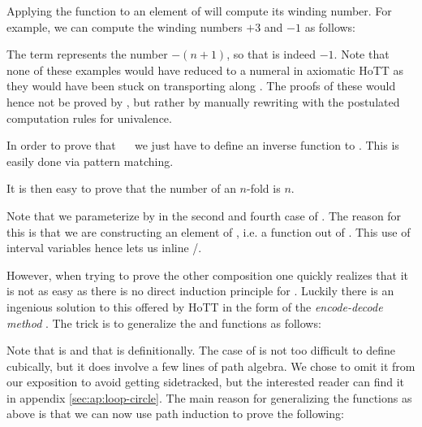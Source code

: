 Applying the  function to an element of  will
compute its winding number. For example, we can compute the winding
numbers $+3$ and $-1$ as follows:
%

The term   represents the number $- (n+1)$, so that
  is indeed $-1$. Note that none of these examples
would have reduced to a numeral in axiomatic HoTT as they would have been stuck
on transporting along . The proofs of these would hence not
be proved by , but rather by manually rewriting with the
postulated computation rules for univalence.

In order to prove that  \ \  we just have
to define an inverse function to . This is easily done
via pattern matching.
%


It is then easy to prove that the  number of an $n$-fold
 is $n$.
%

Note that we parameterize by  in the second and fourth case of
. The reason for this is that we are constructing
an element of , i.e. a function out of . This use of
interval variables hence lets us inline /.

However, when trying to prove the other composition one quickly
realizes that it is not as easy as there is no direct induction
principle for .
Luckily there is an ingenious solution to
this offered by HoTT in the form of the \emph{encode-decode method}
. The trick is to generalize the
 and  functions as follows:
%

Note that   is  and that
  is  definitionally. The
 case of  is not too difficult to define cubically,
but it does involve a few lines of path algebra. We chose to omit
it from our exposition to avoid getting sidetracked, but the interested
reader can find it in appendix \ref{sec:ap:loop-circle}.
% 
The main reason for generalizing the functions as above
is that we can now use path induction to prove the following:
%

